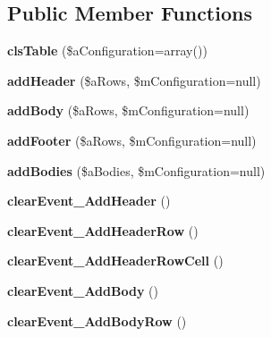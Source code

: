 \subsection*{Public Member Functions}
\begin{DoxyCompactItemize}
\item 
\hypertarget{classclsTable_a18a4df090105f16a244a1bc46f2f1d87}{
{\bfseries clsTable} (\$aConfiguration=array())}
\label{classclsTable_a18a4df090105f16a244a1bc46f2f1d87}

\item 
\hypertarget{classclsTable_a262fb6d049483fe33fb81e44cb994bd7}{
{\bfseries addHeader} (\$aRows, \$mConfiguration=null)}
\label{classclsTable_a262fb6d049483fe33fb81e44cb994bd7}

\item 
\hypertarget{classclsTable_af3c5d36e22e3f891c57390a87935375e}{
{\bfseries addBody} (\$aRows, \$mConfiguration=null)}
\label{classclsTable_af3c5d36e22e3f891c57390a87935375e}

\item 
\hypertarget{classclsTable_aa16f2accd30c5813187a1fd84b64220e}{
{\bfseries addFooter} (\$aRows, \$mConfiguration=null)}
\label{classclsTable_aa16f2accd30c5813187a1fd84b64220e}

\item 
\hypertarget{classclsTable_ad85caaa00223b43dea7d52fad7c0c314}{
{\bfseries addBodies} (\$aBodies, \$mConfiguration=null)}
\label{classclsTable_ad85caaa00223b43dea7d52fad7c0c314}

\item 
\hypertarget{classclsTable_a4d808f2be691e240d6a8daa6ac3460de}{
{\bfseries clearEvent\_\-AddHeader} ()}
\label{classclsTable_a4d808f2be691e240d6a8daa6ac3460de}

\item 
\hypertarget{classclsTable_a9f25be9d6071147b9f8d929e0f032d11}{
{\bfseries clearEvent\_\-AddHeaderRow} ()}
\label{classclsTable_a9f25be9d6071147b9f8d929e0f032d11}

\item 
\hypertarget{classclsTable_aaebd11bc3174fe6a1608807d86856995}{
{\bfseries clearEvent\_\-AddHeaderRowCell} ()}
\label{classclsTable_aaebd11bc3174fe6a1608807d86856995}

\item 
\hypertarget{classclsTable_a9a3bb775c71fd32079a3a7b97b267402}{
{\bfseries clearEvent\_\-AddBody} ()}
\label{classclsTable_a9a3bb775c71fd32079a3a7b97b267402}

\item 
\hypertarget{classclsTable_a4cbed92ce4eaadb2468a2ca91d22fc3c}{
{\bfseries clearEvent\_\-AddBodyRow} ()}
\label{classclsTable_a4cbed92ce4eaadb2468a2ca91d22fc3c}


\end{DoxyCompactItemize}
